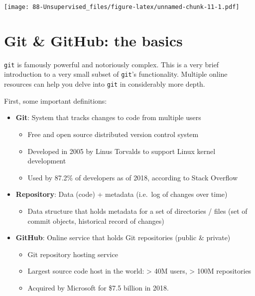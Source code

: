 \documentclass[
]{book}
\providecommand{\tightlist}{%
  \setlength{\itemsep}{0pt}\setlength{\parskip}{0pt}}
\begin{document}
\texttt{[image: 88-Unsupervised\_files/figure-latex/unnamed-chunk-11-1.pdf]}

\hypertarget{git}{%
\chapter{Git \& GitHub: the basics}\label{git}}

\texttt{git} is famously powerful and notoriously complex. This is a very brief introduction to a very small subset of \texttt{git}'s functionality. Multiple online resources can help you delve into \texttt{git} in considerably more depth.

First, some important definitions:

\begin{itemize}
\tightlist
\item
  \textbf{Git}: System that tracks changes to code from multiple users

  \begin{itemize}
  \tightlist
  \item
    Free and open source distributed version control system
  \item
    Developed in 2005 by Linus Torvalds to support Linux kernel development
  \item
    Used by 87.2\% of developers as of 2018, according to Stack Overflow
  \end{itemize}
\item
  \textbf{Repository}: Data (code) + metadata (i.e.~log of changes over time)

  \begin{itemize}
  \tightlist
  \item
    Data structure that holds metadata for a set of directories / files (set of commit objects, historical record of changes)
  \end{itemize}
\item
  \textbf{GitHub}: Online service that holds Git repositories (public \& private)

  \begin{itemize}
  \tightlist
  \item
    Git repository hosting service
  \item
    Largest source code host in the world: \textgreater{} 40M users, \textgreater{} 100M repositories
  \item
    Acquired by Microsoft for \$7.5 billion in 2018.
  \end{itemize}
\end{itemize}
\end{document}
